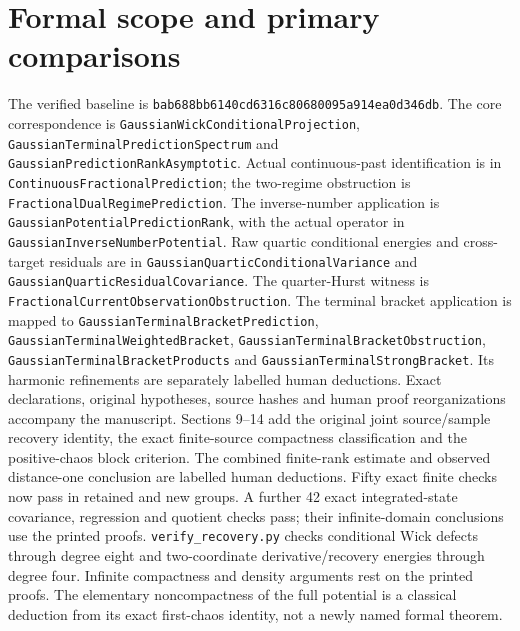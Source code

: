 \documentclass[11pt]{article}
\newcommand{\code}[1]{{\small\nolinkurl{#1}}}
\begin{document}
\section{Formal scope and primary comparisons}
\begingroup\raggedright
The verified baseline is
\code{bab688bb6140cd6316c80680095a914ea0d346db}.
The core correspondence is \code{GaussianWickConditionalProjection},
\code{GaussianTerminalPredictionSpectrum} and
\code{GaussianPredictionRankAsymptotic}. Actual continuous-past
identification is in \code{ContinuousFractionalPrediction}; the
two-regime obstruction is \code{FractionalDualRegimePrediction}.
The inverse-number application is \code{GaussianPotentialPredictionRank},
with the actual operator in \code{GaussianInverseNumberPotential}.
Raw quartic conditional energies and cross-target residuals are in
\code{GaussianQuarticConditionalVariance} and
\code{GaussianQuarticResidualCovariance}. The quarter-Hurst witness is
\code{FractionalCurrentObservationObstruction}.
The terminal bracket application is mapped to \code{GaussianTerminalBracketPrediction}, \code{GaussianTerminalWeightedBracket}, \code{GaussianTerminalBracketObstruction}, \code{GaussianTerminalBracketProducts} and \code{GaussianTerminalStrongBracket}. Its harmonic refinements are separately labelled human deductions. Exact declarations, original hypotheses, source hashes and human proof
reorganizations accompany the manuscript. Sections 9--14 add the
original joint source/sample recovery identity, the exact finite-source
compactness classification and the positive-chaos block criterion. The
combined finite-rank estimate and observed distance-one conclusion are
labelled human deductions. Fifty exact finite checks now pass in retained
and new groups. A further 42 exact integrated-state covariance, regression and quotient checks pass; their infinite-domain conclusions use the printed proofs. \code{verify_recovery.py} checks conditional Wick defects
through degree eight and two-coordinate derivative/recovery energies
through degree four. Infinite compactness and density arguments rest on
the printed proofs. The elementary noncompactness
of the full potential is a classical deduction from its exact first-chaos
identity, not a newly named formal theorem.
\end{document}
